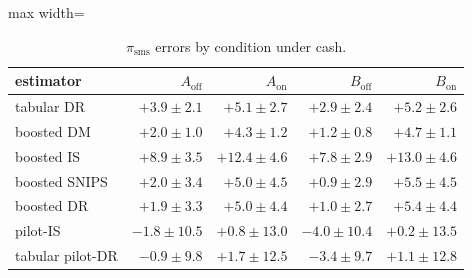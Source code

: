 \begin{table}[!htbp]
\centering
\caption{$\pi_{\mathrm{sms}}$ errors by condition under cash.}
\label{tab:campaignsms_cash}
\footnotesize
\begin{adjustbox}{max width=\linewidth}
\begin{tabular}{lrrrr}
\toprule
estimator & $A_{\mathrm{off}}$ & $A_{\mathrm{on}}$ & $B_{\mathrm{off}}$ & $B_{\mathrm{on}}$ \\
\midrule
tabular DR & $+3.9 \pm 2.1$ & $+5.1 \pm 2.7$ & $+2.9 \pm 2.4$ & $+5.2 \pm 2.6$ \\
boosted DM & $+2.0 \pm 1.0$ & $+4.3 \pm 1.2$ & $+1.2 \pm 0.8$ & $+4.7 \pm 1.1$ \\
boosted IS & $+8.9 \pm 3.5$ & $+12.4 \pm 4.6$ & $+7.8 \pm 2.9$ & $+13.0 \pm 4.6$ \\
boosted SNIPS & $+2.0 \pm 3.4$ & $+5.0 \pm 4.5$ & $+0.9 \pm 2.9$ & $+5.5 \pm 4.5$ \\
boosted DR & $+1.9 \pm 3.3$ & $+5.0 \pm 4.4$ & $+1.0 \pm 2.7$ & $+5.4 \pm 4.4$ \\
pilot-IS & $-1.8 \pm 10.5$ & $+0.8 \pm 13.0$ & $-4.0 \pm 10.4$ & $+0.2 \pm 13.5$ \\
tabular pilot-DR & $-0.9 \pm 9.8$ & $+1.7 \pm 12.5$ & $-3.4 \pm 9.7$ & $+1.1 \pm 12.8$ \\
\bottomrule
\end{tabular}
\end{adjustbox}
\end{table}
